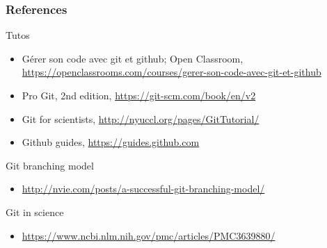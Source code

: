 \documentclass[t,11pt]{beamer}
\begin{document}
\begin{frame}[allowframebreaks]
        \frametitle{References}
         Tutos
         \begin{itemize}
                 \item Gérer son code avec git et github; Open Classroom, \href{https://openclassrooms.com/courses/gerer-son-code-avec-git-et-github}{https://openclassrooms.com/courses/gerer-son-code-avec-git-et-github}
                \item Pro Git, 2nd edition, \href{https://git-scm.com/book/en/v2}{https://git-scm.com/book/en/v2} 
                \item Git for scientists, \href{http://nyuccl.org/pages/GitTutorial/}{http://nyuccl.org/pages/GitTutorial/}
                \item Github guides, \href{https://guides.github.com}{https://guides.github.com}

        \end{itemize}

        Git branching model
\begin{itemize} \item \href{http://nvie.com/posts/a-successful-git-branching-model/}{http://nvie.com/posts/a-successful-git-branching-model/} \end{itemize}

        Git in science
\begin{itemize} \item \href{https://www.ncbi.nlm.nih.gov/pmc/articles/PMC3639880/}{https://www.ncbi.nlm.nih.gov/pmc/articles/PMC3639880/} \end{itemize}

\end{frame}
\end{document}
